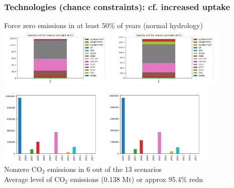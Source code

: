 \documentclass[xcolor=dvipsnames]{beamer}
\begin{document}
\begin{frame}
  \frametitle{Technologies (chance constraints):
    cf. increased uptake}

\centering
Force zero emissions in at least 50\% of years (normal hydrology)\\
\includegraphics[clip,trim=1.25cm 0.95cm 0.0cm 0.0cm,height=2.8cm]{includes/SccConstraint.png}
\includegraphics[clip,trim=1.25cm 0.95cm 5.1cm 0.0cm,height=2.8cm]{includes/SccConstraintv20.png}\\
  \includegraphics[width=0.4\textwidth]{includes/CCvalues.png}\qquad
  \includegraphics[width=0.4\textwidth]{includes/CCvaluesv20.png}\\

  Nonzero CO$_{2}$ emissions in 6 out of the 13 scenarios\\
  Average level of CO$_{2}$ emissions (0.138 Mt) or approx 95.4\% redn

\end{frame}
\end{document}
